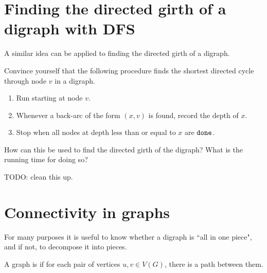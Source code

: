 \section{Finding the directed girth of a digraph with DFS}

A similar idea can be applied to finding the directed girth of a digraph.

\begin{Boxample}[2.5]
Convince yourself that the following procedure finds the shortest directed cycle through node $v$ in a digraph.

\begin{enumerate}
\item Run  starting at node $v$.
\item Whenever a back-arc of the form $(x,v)$ is found, record the depth of $x$.
\item Stop when all nodes at depth less than or equal to $x$ are $\operatorname{\text{\texttt{done}}}$.
\end{enumerate}

\vspace{2.5cm}
How can this be used to find the directed girth of the digraph? What is the running time for doing so?

TODO: clean this up.
\end{Boxample}

\section{Connectivity in graphs}

For many purposes it is useful to know whether a digraph is ``all in one
piece", and if not, to decompose it into pieces.


\begin{Definition} 
A graph is  if for each pair of 
vertices $u, v \in V(G)$, there is a path between them.
\end{Definition}

